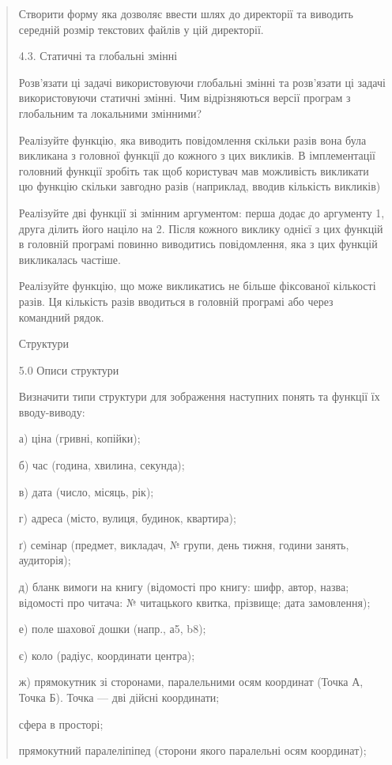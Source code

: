 \documentclass[]{article}
\begin{document}
\begin{quote}
Створити форму яка дозволяє ввести шлях до директорії та виводить
середній розмір текстових файлів у цій директорії.

4.3. Статичні та глобальні змінні

Розв'язати ці задачі використовуючи глобальні змінні та розв'язати ці
задачі використовуючи статичні змінні. Чим відрізняються версії програм
з глобальним та локальними змінними?

Реалізуйте функцію, яка виводить повідомлення скільки разів вона була
викликана з головної функції до кожного з цих викликів. В імплементації
головний функції зробіть так щоб користувач мав можливість викликати цю
функцію скільки завгодно разів (наприклад, вводив кількість викликів)

Реалізуйте дві функції зі змінним аргументом: перша додає до аргументу
1, друга ділить його націло на 2. Після кожного виклику однієї з цих
функцій в головній програмі повинно виводитись повідомлення, яка з цих
функцій викликалась частіше.

Реалізуйте функцію, що може викликатись не більше фіксованої кількості
разів. Ця кількість разів вводиться в головній програмі або через
командний рядок.

\protect\hypertarget{_Hlk48905535}{}{}Структури

5.0 Описи структури

Визначити типи структури для зображення наступних понять та функції їх
вводу-виводу:

а) ціна (гривні, копійки);

б) час (година, хвилина, секунда);

в) дата (число, місяць, рік);

г) адреса (місто, вулиця, будинок, квартира);

ґ) семінар (предмет, викладач, № групи, день тижня, години занять,
аудиторія);

д) бланк вимоги на книгу (відомості про книгу: шифр, автор, назва;
відомості про читача: № читацького квитка, прізвище; дата замовлення);

е) поле шахової дошки (напр., а5, b8);

є) коло (радіус, координати центра);

ж) прямокутник зі сторонами, паралельними осям координат (Точка А, Точка
Б). Точка --- дві дійсні координати;

сфера в просторі;

прямокутний паралеліпіпед (сторони якого паралельні осям координат);


\end{quote}
\end{document}
